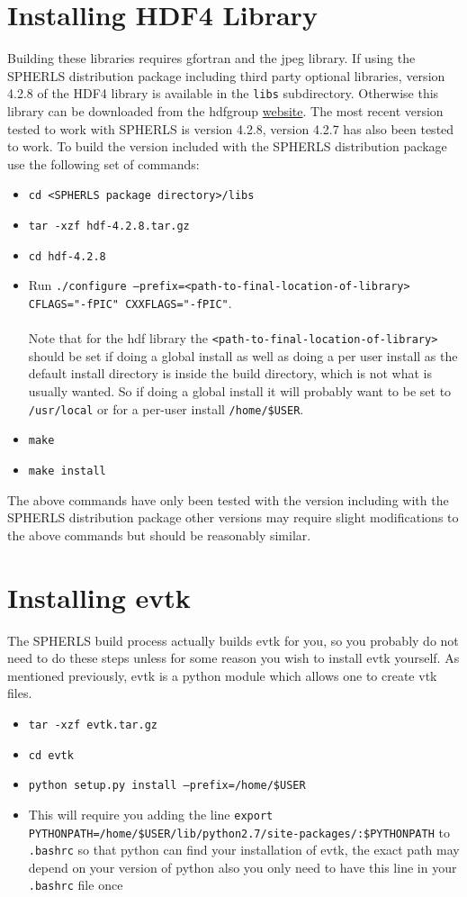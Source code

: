 \documentclass[12pt,a4paper]{book}
\begin{document}
\section{Installing HDF4 Library}
Building these libraries requires gfortran and the jpeg library. If using the SPHERLS distribution package including third party optional libraries, version 4.2.8 of the HDF4 library is available in the {\tt libs} subdirectory. Otherwise this library can be downloaded from the hdfgroup \href{http://www.hdfgroup.org/ftp/HDF/HDF_Current/src/}{website}. The most recent version tested to work with SPHERLS is version 4.2.8, version 4.2.7 has also been tested to work. To build the version included with the SPHERLS distribution package use the following set of commands:
\begin{itemize}
\item {\tt cd <SPHERLS package directory>/libs}
\item {\tt tar -xzf hdf-4.2.8.tar.gz}
\item {\tt cd hdf-4.2.8}
\item Run {\tt ./configure --prefix=<path-to-final-location-of-library> CFLAGS="-fPIC" CXXFLAGS="-fPIC"}.\\
 \\
Note that for the hdf library the {\tt <path-to-final-}{\tt location-of-library>} should be set if doing a global install as well as doing a per user install as the default install directory is inside the build directory, which is not what is usually wanted. So if doing a global install it will probably want to be set to {\tt /usr/local} or for a per-user install {\tt /home/\$USER}.
 \\
\item {\tt make}
\item {\tt make install}
\end{itemize}
The above commands have only been tested with the version including with the SPHERLS distribution package other versions may require slight modifications to the above commands but should be reasonably similar.

\section{Installing evtk}
The SPHERLS build process actually builds evtk for you, so you probably do not need to do these steps unless for some reason you wish to install evtk yourself. As mentioned previously, evtk is a python module which allows one to create vtk files.
\begin{itemize}
\item {\tt tar -xzf evtk.tar.gz}
\item {\tt cd evtk}
\item {\tt  python setup.py install --prefix=/home/\$USER}
\item This will require you adding the line {\tt export PYTHONPATH\-=/home/\-\$USER/\-lib/\-python2.7/\-site-packages/\-:\$PYTHONPATH} to {\tt .bashrc} so that python can find your installation of evtk, the exact path may depend on your version of python also you only need to have this line in your {\tt .bashrc} file once
\end{itemize}
\end{document}
